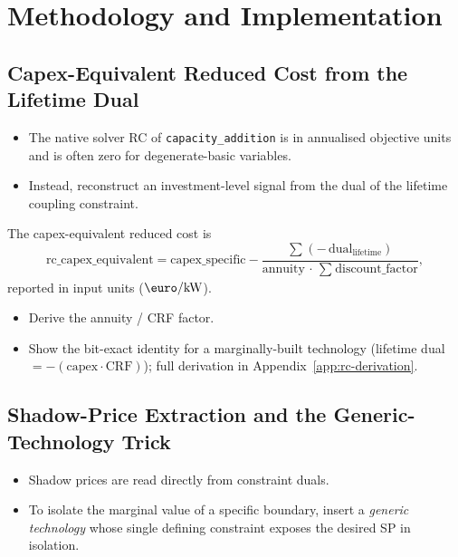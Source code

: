 \section{Methodology and Implementation}
\label{sec:methodology}

\subsection{Capex-Equivalent Reduced Cost from the Lifetime Dual}
\label{sec:capex-equivalent}
\begin{itemize}
	\item The native solver \ac{RC} of \texttt{capacity\_addition} is in
	annualised objective units and is often zero for degenerate-basic variables.
	\item Instead, reconstruct an investment-level signal from the dual of the
	lifetime coupling constraint.
\end{itemize}

The capex-equivalent reduced cost is
\begin{equation}
	\label{eq:rc-capex}
	\text{rc\_capex\_equivalent}
	= \text{capex\_specific}
	- \frac{\sum_{} \left(-\,\text{dual}_\text{lifetime}\right)}
	       {\text{annuity}\,\cdot\,\sum_{} \text{discount\_factor}} ,
\end{equation}
reported in input units ($\si{\text{\euro}\per\kilo\watt}$).
\begin{itemize}
	\item Derive the annuity / \ac{CRF} factor.
	\item Show the bit-exact identity for a marginally-built technology
	(lifetime dual $=-(\text{capex}\cdot\text{CRF})$); full derivation in
	Appendix~\ref{app:rc-derivation}.
\end{itemize}

\subsection{Shadow-Price Extraction and the Generic-Technology Trick}
\label{sec:shadow-price}
\begin{itemize}
	\item Shadow prices are read directly from constraint duals.
	\item To isolate the marginal value of a specific boundary, insert a
	\emph{generic technology} whose single defining constraint exposes the
	desired \ac{SP} in isolation.
\end{itemize}
